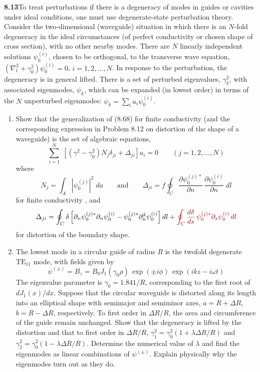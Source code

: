 \par\bigskip
\noindent\textbf{8.13}\quad To treat perturbations if there is a degeneracy of modes in guides or cavities under ideal conditions, one must use degenerate-state perturbation theory. Consider the two-dimensional (waveguide) situation in which there is an $N$-fold degeneracy in the ideal circumstances (of perfect conductivity or chosen shape of cross section), with no other nearby modes. There are $N$ linearly independent solutions $\psi_{0}^{(i)}$, chosen to be orthogonal, to the transverse wave equation, $(\nabla_{t}^{2}+\gamma_{0}^{2})\psi_{0}^{(i)}=0$, $i=1,2,\ldots,N$. In response to the perturbation, the degeneracy is in general lifted. There is a set of perturbed eigenvalues, $\gamma_{k}^{2}$, with associated eigenmodes, $\psi_{k}$, which can be expanded (in lowest order) in terms of the $N$ unperturbed eigenmodes: $\psi_{k}=\sum_{i}a_{i}\psi_{0}^{(i)}$.
\begin{enumerate}
\item[(a)] Show that the generalization of (8.68) for finite conductivity (and the corresponding expression in Problem 8.12 on distortion of the shape of a waveguide) is the set of algebraic equations,
\[
\sum_{i=1}^{N}\;[(\gamma^{2}-\gamma_{0}^{2})N_{j}\delta_{ji}+\Delta_{ji}]a_{i}=0\qquad(j=1,2,\ldots,N)
\]
where
\[
N_{j}=\int_{A}|\psi_{0}^{(j)}|^{2}\;da\qquad\text{and}\qquad
\Delta_{ji}=f\oint_{C}\frac{\partial\psi_{0}^{(j)*}}{\partial n}\,\frac{\partial\psi_{0}^{(i)}}{\partial n}\;dl
\]
for finite conductivity , and
\[
\Delta_{ji}=\oint_C\delta\left[
\partial_n\psi_0^{(j)*}\partial_n\psi_0^{(i)}
-\psi_0^{(j)*}\partial_n^2\psi_0^{(i)}\right]dl
+\erratum{\oint_C\frac{d\delta}{ds}\,
\psi_0^{(j)*}\partial_s\psi_0^{(i)}\,dl}
\]
for distortion of the boundary shape. 
\item[(b)] The lowest mode in a circular guide of radius $R$ is the twofold degenerate $\mathrm{TE}_{11}$ mode, with fields given by
\[
\psi^{(\pm)}=B_{z}=B_{0}J_{1}(\gamma_{0}\rho)\,\exp(\pm i\phi)\,\exp(ikz-i\omega t)
\]
The eigenvalue parameter is $\gamma_{0}=1.841/R$, corresponding to the first root of $dJ_{1}(x)/dx$. Suppose that the circular waveguide is distorted along its length into an elliptical shape with semimajor and semiminor axes, $a=R+\Delta R$, $b=R-\Delta R$, respectively. To first order in $\Delta R/R$, the area and circumference of the guide remain unchanged. Show that the degeneracy is lifted by the distortion and that to first order in $\Delta R/R$, $\gamma_{1}^{2}=\gamma_{0}^{2}(1+\lambda\Delta R/R)$ and $\gamma_{2}^{2}=\gamma_{0}^{2}(1-\lambda\Delta R/R)$. Determine the numerical value of $\lambda$ and find the eigenmodes as linear combinations of $\psi^{(\pm)}$. Explain physically why the eigenmodes turn out as they do.
\end{enumerate}
\solution


